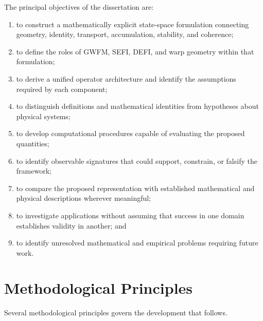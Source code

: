 \documentclass[12pt,oneside]{book}
\begin{document}
The principal objectives of the dissertation are:

\begin{enumerate}[label=\arabic*., leftmargin=*]

    \item
    to construct a mathematically explicit state-space
    formulation connecting geometry, identity, transport,
    accumulation, stability, and coherence;

    \item
    to define the roles of GWFM, SEFI, DEFI, and warp geometry
    within that formulation;

    \item
    to derive a unified operator architecture and identify the
    assumptions required by each component;

    \item
    to distinguish definitions and mathematical identities from
    hypotheses about physical systems;

    \item
    to develop computational procedures capable of evaluating
    the proposed quantities;

    \item
    to identify observable signatures that could support,
    constrain, or falsify the framework;

    \item
    to compare the proposed representation with established
    mathematical and physical descriptions wherever meaningful;

    \item
    to investigate applications without assuming that success
    in one domain establishes validity in another; and

    \item
    to identify unresolved mathematical and empirical problems
    requiring future work.

\end{enumerate}


\section{Methodological Principles}
\label{sec:methodological-principles}

Several methodological principles govern the development that
follows.
\end{document}
